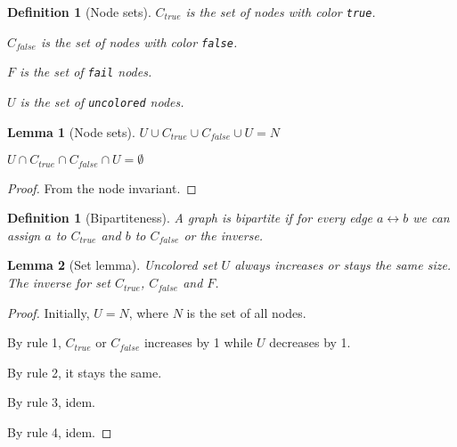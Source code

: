 \documentclass[9pt]{article}
\newtheorem{lemma}{Lemma}
\newtheorem{definition}[theorem]{Definition}
\begin{document}
\begin{definition}[Node sets]
$C_{true}$ is the set of nodes with color \texttt{true}.

$C_{false}$ is the set of nodes with color \texttt{false}.

$F$ is the set of \texttt{fail} nodes.

$U$ is the set of \texttt{uncolored} nodes.
\end{definition}

\begin{lemma}[Node sets]
$U \cup C_{true} \cup C_{false} \cup U = N$

$U \cap C_{true} \cap C_{false} \cap U = \emptyset$
\end{lemma}

\begin{proof}
From the node invariant.
\end{proof}

\begin{definition}[Bipartiteness]
A graph is bipartite if for every edge $a \leftrightarrow b$ we can assign $a$ to $C_{true}$ and $b$ to $C_{false}$ or the inverse.
\end{definition}

\begin{lemma}[Set lemma]
Uncolored set $U$ always increases or stays the same size. The inverse for set $C_{true}$, $C_{false}$ and $F$.
\end{lemma}
\begin{proof}
Initially, $U = N$, where $N$ is the set of all nodes.

By rule 1, $C_{true}$ or $C_{false}$ increases by 1 while $U$ decreases by 1.

By rule 2, it stays the same.

By rule 3, idem.

By rule 4, idem.
\end{proof}
\end{document}

